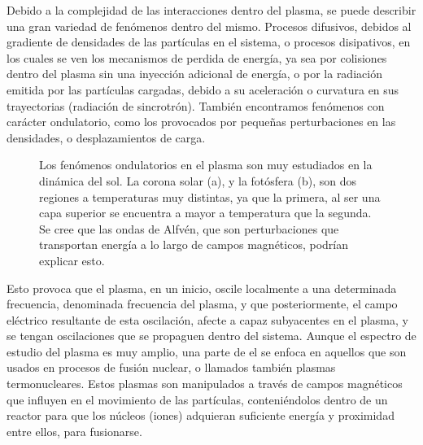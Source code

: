 \documentclass[../main.tex]{subfiles}
\begin{document}
Debido a la complejidad de las interacciones dentro del plasma, se puede describir una gran variedad de fenómenos dentro del mismo. Procesos difusivos, debidos al gradiente de densidades de las partículas en el sistema, o procesos disipativos, en los cuales se ven los mecanismos de perdida de energía, ya sea por colisiones dentro del plasma sin una inyección adicional de energía, o por la radiación emitida por las partículas cargadas, debido a su aceleración o curvatura en sus trayectorias (radiación de sincrotrón). También encontramos fenómenos con carácter ondulatorio, como los provocados por pequeñas perturbaciones en las densidades, o desplazamientos de carga.
\begin{figure}[htbp]
        \centering
        \caption{Los fenómenos ondulatorios en el plasma son muy estudiados en la dinámica del sol. La corona solar (a), y la fotósfera (b), son dos regiones a temperaturas muy distintas, ya que la primera, al ser una capa superior se encuentra a mayor a temperatura que la segunda. Se cree que las ondas de Alfvén, que son perturbaciones que transportan energía a lo largo de campos magnéticos, podrían explicar esto.} \label{fig:cap1}
    \end{figure}

Esto provoca que el plasma, en un inicio, oscile localmente a una determinada frecuencia, denominada frecuencia del plasma, y que posteriormente, el campo eléctrico resultante de esta oscilación, afecte a capaz subyacentes en el plasma, y se tengan oscilaciones que se propaguen dentro del sistema. Aunque el espectro de estudio del plasma es muy amplio, una parte de el se enfoca en aquellos que son usados en procesos de fusión nuclear, o llamados también plasmas termonucleares. Estos plasmas son manipulados a través de campos magnéticos que influyen en el movimiento de las partículas, conteniéndolos dentro de un reactor para que los núcleos (iones) adquieran suficiente energía y proximidad entre ellos, para fusionarse. \\
\end{document}
